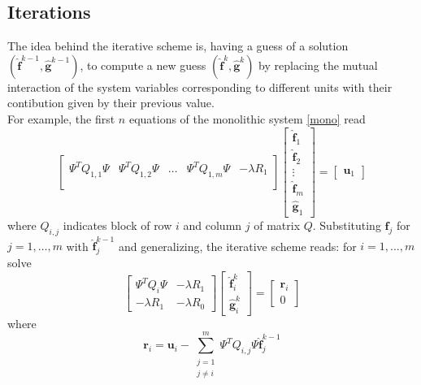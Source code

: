 \subsection{Iterations}
The idea behind the iterative scheme is, having a guess of a solution $(\hat{\mathbf{f}}^{k-1},\hat{\mathbf{g}}^{k-1})$, to compute a new guess $(\hat{\mathbf{f}}^k,\hat{\mathbf{g}}^k)$ by replacing the mutual interaction of the system variables corresponding to different units with their contibution given by their previous value.\\
For example, the first $n$ equations of the monolithic system \ref{mono} read
\begin{equation}
    \begin{bmatrix}
        \Psi^TQ_{1,1}\Psi & \Psi^TQ_{1,2}\Psi &\dots &\Psi^TQ_{1,m}\Psi & -\lambda R_1\\
    \end{bmatrix}
    \begin{bmatrix}
        \hat{\mathbf{f}}_1\\
        \hat{\mathbf{f}}_2\\
        \vdots\\
        \hat{\mathbf{f}}_m\\
        \hat{\mathbf{g}}_1    
    \end{bmatrix}
    =
    \begin{bmatrix}
        \mathbf{u}_1
    \end{bmatrix}
\end{equation}
where $Q_{i,j}$ indicates block of row $i$ and column $j$ of matrix $Q$.
Substituting $\hat{\mathbf{f}}_j$ for $j=1,\dots,m$ with $\hat{\mathbf{f}}_j^{k-1}$ and generalizing, the iterative scheme reads: for $i = 1, \dots, m$ solve
\begin{equation}
    \begin{bmatrix}
        \Psi^TQ_i\Psi & -\lambda R_1\\
        -\lambda R_1  & -\lambda R_0
    \end{bmatrix}
    \begin{bmatrix}
        \hat{\mathbf{f}}_i^k\\
        \hat{\mathbf{g}}_i^k
    \end{bmatrix}
    =
    \begin{bmatrix}
        \mathbf{r}_i\\
        0
    \end{bmatrix}
\end{equation}
where
\begin{equation}
     \mathbf{r}_i =\mathbf{u}_i -\sum_{\substack{j=1\\ j\neq i}}^m \Psi^TQ_{i,j} \Psi \hat{\mathbf{f}}_j^{k-1}
\end{equation}


